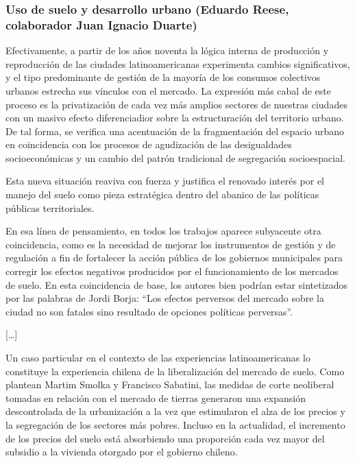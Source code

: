 \subsubsection*{Uso de suelo y desarrollo urbano (Eduardo Reese,  colaborador Juan Ignacio Duarte)}
Efectivamente, a partir de los años noventa la lógica interna de producción y reproducción de las
ciudades latinoamericanas experimenta cambios significativos, y el tipo predominante de gestión de
la mayoría de los consumos colectivos urbanos estrecha sus vínculos con el mercado. La expresión más
cabal de este proceso es la privatización de cada vez más amplios sectores de nuestras ciudades con
un masivo efecto diferenciadior sobre la estructuración del territorio urbano. De tal forma, se
verifica una acentuación de la fragmentación del espacio urbano en coincidencia con los procesos de
agudización de las desigualdades socioeconómicas y un cambio del patrón tradicional de segregación
socioespacial.

Esta nueva situación reaviva con fuerza y justifica el renovado interés por el manejo del suelo como
pieza estratégica dentro del abanico de las políticas públicas territoriales. 

En esa línea de pensamiento, en todos los trabajos aparece subyacente otra coincidencia, como es la
necesidad de mejorar los instrumentos de gestión y de regulación a fin de fortalecer la acción
pública de los gobiernos municipales para corregir los efectos negativos producidos por el
funcionamiento de los mercados de suelo. En esta coincidencia de base, los autores bien podrían
estar sintetizados por las palabras de Jordi Borja: ``Los efectos perversos del mercado sobre la
ciudad no son fatales sino resultado de opciones políticas perversas''.

[\ldots]

Un caso particular en el contexto de las experiencias latinoamericanas lo constituye la experiencia
chilena de la liberalización del mercado de suelo. Como plantean Martim Smolka y Francisco Sabatini,
las medidas de corte neoliberal tomadas en relación con el mercado de tierras generaron una
expansión descontrolada de la urbanización a la vez que estimularon el alza de los precios y la
segregación de los sectores más pobres. Incluso en la actualidad, el incremento de los precios del
suelo está absorbiendo una proporción cada vez mayor del subsidio a la vivienda otorgado por el
gobierno chileno.

